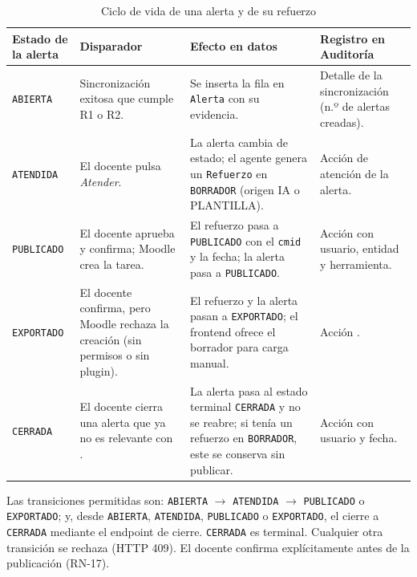 \documentclass[11pt,a4paper]{article}
\newcommand{\hd}[1]{\textbf{#1}}
\begin{document}
\begin{table}[H]
\centering\small
\caption{Ciclo de vida de una alerta y de su refuerzo}
\begin{tabularx}{\textwidth}{|R{2.5cm}|R{3.0cm}|R{3.6cm}|Y|}
\hline
\hd{Estado de la alerta} & \hd{Disparador} & \hd{Efecto en datos} & \hd{Registro en Auditoría}\\ \hline
\texttt{ABIERTA} & Sincronización exitosa que cumple R1 o R2. & Se inserta la fila en \texttt{Alerta} con su evidencia. & Detalle de la sincronización (n.º de alertas creadas).\\ \hline
\texttt{ATENDIDA} & El docente pulsa \emph{Atender}. & La alerta cambia de estado; el agente genera un \texttt{Refuerzo} en \texttt{BORRADOR} (origen IA o PLANTILLA). & Acción de atención de la alerta.\\ \hline
\texttt{PUBLICADO} & El docente aprueba y confirma; Moodle crea la tarea. & El refuerzo pasa a \texttt{PUBLICADO} con el \texttt{cmid} y la fecha; la alerta pasa a \texttt{PUBLICADO}. & Acción  con usuario, entidad y herramienta.\\ \hline
\texttt{EXPORTADO} & El docente confirma, pero Moodle rechaza la creación (sin permisos o sin plugin). & El refuerzo y la alerta pasan a \texttt{EXPORTADO}; el frontend ofrece el borrador para carga manual. & Acción .\\ \hline
\texttt{CERRADA} & El docente cierra una alerta que ya no es relevante con . & La alerta pasa al estado terminal \texttt{CERRADA} y no se reabre; si tenía un refuerzo en \texttt{BORRADOR}, este se conserva sin publicar. & Acción  con usuario y fecha.\\ \hline
\end{tabularx}
\end{table}
Las transiciones permitidas son: \texttt{ABIERTA} $\rightarrow$ \texttt{ATENDIDA} $\rightarrow$ \texttt{PUBLICADO} o \texttt{EXPORTADO}; y, desde \texttt{ABIERTA}, \texttt{ATENDIDA}, \texttt{PUBLICADO} o \texttt{EXPORTADO}, el cierre a \texttt{CERRADA} mediante el endpoint de cierre. \texttt{CERRADA} es terminal. Cualquier otra transición se rechaza (HTTP 409). El docente confirma explícitamente antes de la publicación (RN-17).
\end{document}
